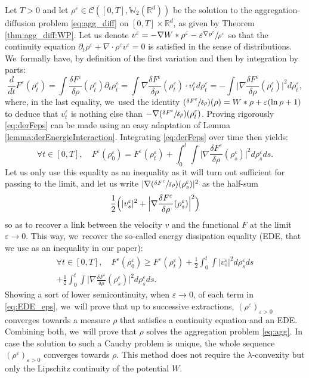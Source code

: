 \documentclass[JEP,XML,SOM,Unicode, NoFloatCountersInSection,published]{cedram}
\newcommand{\Psfrac}[2]{(\sfrac{#1}{#2})}
\def\RR{\mathbb{R}}
\def\WW{\mathbb{W}}
\def\eps{\varepsilon}
\def\pa{\partial}
\def\calC{{\mathcal C}}
\theoremstyle{plain}
\theoremstyle{definition}
\begin{document}
Let $T>0$ and let $\rho^\eps \in \calC([0,T], \WW_2(\RR^d))$ be the solution to the aggregation-diffusion problem \eqref{eq:agg_diff} on $[0,T] \times \RR^d$, as given by Theorem \ref{thm:agg_diff:WP}. Let us denote $v^\eps = - \nabla W * \rho^\eps - \eps \sfrac{\nabla \rho^\eps}{\rho^\eps}$ so that the continuity equation $\pa_t \rho^\eps + \nabla \cdot \rho^\eps v^\eps = 0$ is satisfied in the sense of distributions. We~formally have, by definition of the first variation and then by integration by parts:
\begin{equation}\label{eq:derFeps}
\frac{d}{dt} F^\eps(\rho_t^\eps) = \int \frac{\delta F^\eps}{\delta \rho}(\rho_t^\eps) \pa_t \rho_t^\eps = \int \nabla \frac{\delta F^\eps}{\delta \rho}(\rho_t^\eps) \cdot v_t^\eps d\rho_t^\eps = - \int \Big| \nabla \frac{\delta F^\eps}{\delta \rho}(\rho_t^\eps) \Big|^2 d\rho_t^\eps,
\end{equation}
where, in the last equality, we~used the identity $\Psfrac{\delta F^\eps}{\delta \rho}(\rho) = W * \rho + \eps (\ln \rho +1)$ to deduce that $v_t^\eps$ is nothing else than $-\nabla \Psfrac{\delta F^\eps}{\delta \rho}(\rho_t^\eps)$. Proving rigorously \eqref{eq:derFeps} can be made using an easy adaptation of Lemma \ref{lemma:derEnergieInteraction}. Integrating \eqref{eq:derFeps} over time then yields:
\[
\forall t \in [0,T], \quad F^\eps(\rho^\eps_0) = F^\eps(\rho^\eps_t) + \int_0^t \int \Big| \nabla \frac{\delta F^\eps}{\delta \rho}(\rho_s^\eps) \Big|^2 d\rho_s^\eps ds.
\]
Let us only use this equality as an inequality as it will turn out sufficient for passing to the limit, and let us write $| \nabla \Psfrac{\delta F^\eps}{\delta \rho}(\rho_s^\eps) |^2$ as the half-sum
\[
\frac 12 \Bigl(|v^\eps_s|^2 + \Big| \nabla \frac{\delta F^\eps}{\delta \rho}(\rho_s^\eps) \Big|^2 \Bigr)
\]
so as to recover a link between the velocity $v$ and the functional $F$ at the limit $\eps \to 0$. This way, we~recover the so-called energy dissipation equality (EDE, that we use as an inequality in our paper):
\begin{multline}\label{eq:EDE_eps}
\forall t \in [0,T], \quad F^\eps(\rho^\eps_0) \geq F^\eps(\rho^\eps_t) + \frac 12 \int_0^t \int |v^\eps_s|^2 d\rho^\eps_s ds\\[-5pt]
+ \frac 12 \int_0^t \int \Big| \nabla \frac{\delta F^\eps}{\delta \rho}(\rho_s^\eps) \Big|^2 d\rho_s^\eps ds.
\end{multline}
Showing a sort of lower semicontinuity, when $\eps \to 0$, of each term in \eqref{eq:EDE_eps}, we~will prove that up to successive extractions, $(\rho^\eps)_{\eps>0}$ converges towards a measure $\rho$ that satisfies a continuity equation and an EDE. Combining both, we~will prove that $\rho$ solves the aggregation problem \eqref{eq:agg}. In case the solution to such a Cauchy problem is unique, the whole sequence $(\rho^\eps)_{\eps>0}$ converges towards $\rho$. This method does not require the $\lambda$-convexity but only the Lipschitz continuity of the potential $W$.
\end{document}
